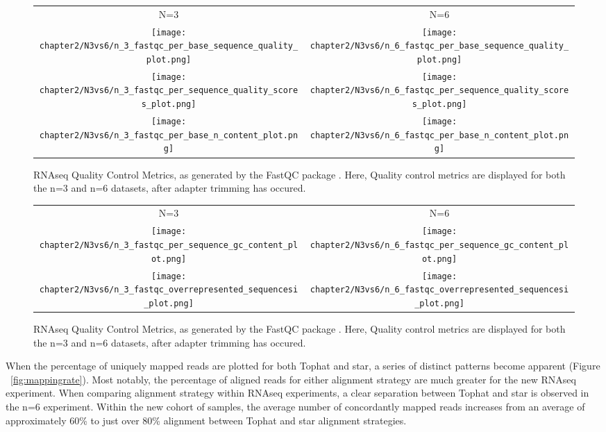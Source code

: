 \begin{figure*}[!htbp]
\centering
\begin{tabular}{cc}
\small{N=3} & \small{N=6} \\
\texttt{[image: chapter2/N3vs6/n\_3\_fastqc\_per\_base\_sequence\_quality\_plot.png]} & \texttt{[image: chapter2/N3vs6/n\_6\_fastqc\_per\_base\_sequence\_quality\_plot.png]} \\
\texttt{[image: chapter2/N3vs6/n\_3\_fastqc\_per\_sequence\_quality\_scores\_plot.png]} & \texttt{[image: chapter2/N3vs6/n\_6\_fastqc\_per\_sequence\_quality\_scores\_plot.png]} \\
\texttt{[image: chapter2/N3vs6/n\_3\_fastqc\_per\_base\_n\_content\_plot.png]} & \texttt{[image: chapter2/N3vs6/n\_6\_fastqc\_per\_base\_n\_content\_plot.png]} \\
\end{tabular}
\caption[RNAseq Quality Control Metrics]{RNAseq Quality Control Metrics, as generated by the FastQC package \cite{Andrews2010}. Here, Quality control metrics are displayed for both the n=3 and n=6 datasets, after adapter trimming has occured.}
\label{fig:n3vs6QCa}
\end{figure*}

\begin{figure*}[!htbp]
\ContinuedFloat 
\centering
\begin{tabular}{cc}
\small{N=3} & \small{N=6} \\
\texttt{[image: chapter2/N3vs6/n\_3\_fastqc\_per\_sequence\_gc\_content\_plot.png]} & \texttt{[image: chapter2/N3vs6/n\_6\_fastqc\_per\_sequence\_gc\_content\_plot.png]} \\
\texttt{[image: chapter2/N3vs6/n\_3\_fastqc\_overrepresented\_sequencesi\_plot.png]} & \texttt{[image: chapter2/N3vs6/n\_6\_fastqc\_overrepresented\_sequencesi\_plot.png]} \\
\end{tabular}
\caption[RNAseq Quality Control Metrics. Continued.]{RNAseq Quality Control Metrics, as generated by the FastQC package \cite{Andrews2010}. Here, Quality control metrics are displayed for both the n=3 and n=6 datasets, after adapter trimming has occured.}
\label{fig:n3QCb}
\end{figure*}

When the percentage of uniquely mapped reads are plotted for both Tophat and \acrshort{star}, a series of distinct patterns become apparent (Figure ~\ref{fig:mappingrate}). Most notably, the percentage of aligned reads for either alignment strategy are much greater for the new RNAseq experiment. When comparing alignment strategy within RNAseq experiments, a clear separation between Tophat and \acrshort{star} is observed in the n=6 experiment. Within the new cohort of samples, the average number of concordantly mapped reads increases from an average of approximately 60\% to just over 80\% alignment between Tophat and \acrshort{star} alignment strategies. \\

